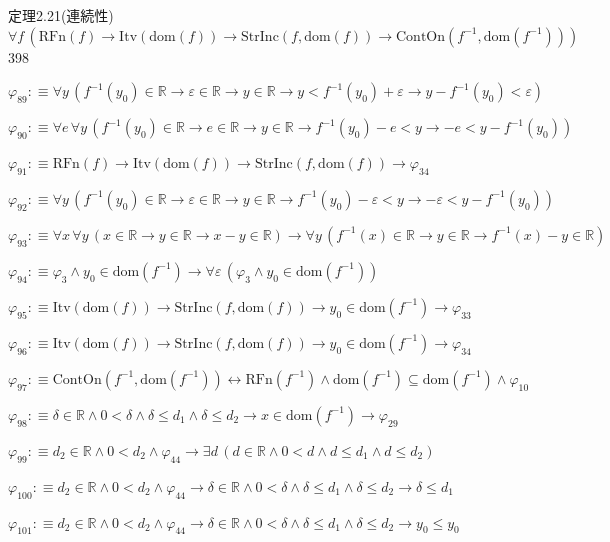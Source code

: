 \begin{fullproof}{定理2.21(連続性)}{$\forall f\,(\mathrm{RFn}(f) \to \mathrm{Itv}(\mathrm{dom}(f)) \to \mathrm{StrInc}(f,\mathrm{dom}(f)) \to \mathrm{ContOn}(f^{-1},\mathrm{dom}(f^{-1})))$}{398}
\begin{abbrevlist}
\item $\varphi_{89} :\equiv \forall y\,(f^{-1}(y_{0}) \in \mathbb{R} \to \varepsilon \in \mathbb{R} \to y \in \mathbb{R} \to y < f^{-1}(y_{0}) + \varepsilon \to y - f^{-1}(y_{0}) < \varepsilon)$
\item $\varphi_{90} :\equiv \forall e\,\forall y\,(f^{-1}(y_{0}) \in \mathbb{R} \to e \in \mathbb{R} \to y \in \mathbb{R} \to f^{-1}(y_{0}) - e < y \to -e < y - f^{-1}(y_{0}))$
\item $\varphi_{91} :\equiv \mathrm{RFn}(f) \to \mathrm{Itv}(\mathrm{dom}(f)) \to \mathrm{StrInc}(f,\mathrm{dom}(f)) \to \varphi_{34}$
\item $\varphi_{92} :\equiv \forall y\,(f^{-1}(y_{0}) \in \mathbb{R} \to \varepsilon \in \mathbb{R} \to y \in \mathbb{R} \to f^{-1}(y_{0}) - \varepsilon < y \to -\varepsilon < y - f^{-1}(y_{0}))$
\item $\varphi_{93} :\equiv \forall x\,\forall y\,(x \in \mathbb{R} \to y \in \mathbb{R} \to x - y \in \mathbb{R}) \to \forall y\,(f^{-1}(x) \in \mathbb{R} \to y \in \mathbb{R} \to f^{-1}(x) - y \in \mathbb{R})$
\item $\varphi_{94} :\equiv \varphi_{3} \land y_{0} \in \mathrm{dom}(f^{-1}) \to \forall \varepsilon\,(\varphi_{3} \land y_{0} \in \mathrm{dom}(f^{-1}))$
\item $\varphi_{95} :\equiv \mathrm{Itv}(\mathrm{dom}(f)) \to \mathrm{StrInc}(f,\mathrm{dom}(f)) \to y_{0} \in \mathrm{dom}(f^{-1}) \to \varphi_{33}$
\item $\varphi_{96} :\equiv \mathrm{Itv}(\mathrm{dom}(f)) \to \mathrm{StrInc}(f,\mathrm{dom}(f)) \to y_{0} \in \mathrm{dom}(f^{-1}) \to \varphi_{34}$
\item $\varphi_{97} :\equiv \mathrm{ContOn}(f^{-1},\mathrm{dom}(f^{-1})) \leftrightarrow \mathrm{RFn}(f^{-1}) \land \mathrm{dom}(f^{-1}) \subseteq \mathrm{dom}(f^{-1}) \land \varphi_{10}$
\item $\varphi_{98} :\equiv \delta \in \mathbb{R} \land 0 < \delta \land \delta \leq d_{1} \land \delta \leq d_{2} \to x \in \mathrm{dom}(f^{-1}) \to \varphi_{29}$
\item $\varphi_{99} :\equiv d_{2} \in \mathbb{R} \land 0 < d_{2} \land \varphi_{44} \to \exists d\,(d \in \mathbb{R} \land 0 < d \land d \leq d_{1} \land d \leq d_{2})$
\item $\varphi_{100} :\equiv d_{2} \in \mathbb{R} \land 0 < d_{2} \land \varphi_{44} \to \delta \in \mathbb{R} \land 0 < \delta \land \delta \leq d_{1} \land \delta \leq d_{2} \to \delta \leq d_{1}$
\item $\varphi_{101} :\equiv d_{2} \in \mathbb{R} \land 0 < d_{2} \land \varphi_{44} \to \delta \in \mathbb{R} \land 0 < \delta \land \delta \leq d_{1} \land \delta \leq d_{2} \to y_{0} \leq y_{0}$

\end{abbrevlist}
\end{fullproof}
